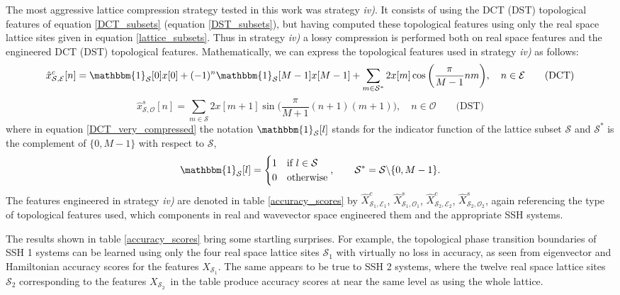 \documentclass[10pt]{revtex4-1}
\newcommand{\indicator}[1]{\mathbbm{1}_{\mathcal{#1}}} %
\newcommand\xSOne{$X_{\mathcal{S}_1}$}
\newcommand\xcSEOne{$\hat{X}^c_{\mathcal{S}_1,\mathcal{E}_1}$}
\newcommand\xsSOOne{$\hat{X}^s_{\mathcal{S}_1,\mathcal{O}_1}$}
\newcommand\xSTwo{$X_{\mathcal{S}_2}$}
\newcommand\xcSETwo{$\hat{X}^c_{\mathcal{S}_2,\mathcal{E}_2}$}
\newcommand\xsSOTwo{$\hat{X}^s_{\mathcal{S}_2,\mathcal{O}_2}$}
\begin{document}
The most aggressive lattice compression strategy tested in this work was strategy \emph{iv)}. It consists of using the DCT (DST) topological features of equation \eqref{DCT_subsets} (equation \eqref{DST_subsets}), but having computed these topological features using only the real space lattice sites given in equation \eqref{lattice_subsets}. Thus in strategy \emph{iv)} a lossy compression is performed both on real space features and the engineered DCT (DST) topological features. Mathematically, we can express the topological features used in strategy \emph{iv)} as follows:
\begin{equation}
\label{DCT_very_compressed}
\hat{x}_{\mathcal{S}, \mathcal{E}}^c[n] = \indicator{\mathcal{S}}[0]x[0] + (-1)^n\indicator{\mathcal{S}}[M-1] x[M-1] + \sum_{m \in \mathcal{S}^*} 2x[m]\cos\bigg(\frac{\pi}{M-1}nm\bigg), \quad n \in \mathcal{E} \qquad \text{(DCT)} 
\end{equation}
\begin{equation}
\label{DST_very_compressed}
\hat{x}_{\mathcal{S}, \mathcal{O}}^s[n] = \sum_{m \in \mathcal{S}}2x[m+1]\sin\bigg(\frac{\pi}{M+1}(n+1)(m+1)\bigg), \quad n \in \mathcal{O} \qquad \text{(DST)}
\end{equation}
where in equation \eqref{DCT_very_compressed} the notation $\mathbbm{1}_{\mathcal{S}}[l]$ stands for the indicator function of the lattice subset $\mathcal{S}$ and $\mathcal{S}^*$ is the complement of $\{0,M-1\}$ with respect to $\mathcal{S}$, 
\begin{equation}
\label{indicator_function}
\indicator{\mathcal{S}}[l] = \begin{cases}
      1 & \text{if } l \in \mathcal{S} \\
      0 & \text{otherwise}
    \end{cases}, \qquad \mathcal{S}^* = \mathcal{S}{\backslash} \{0,M-1\}.
\end{equation}
The features engineered in strategy \emph{iv)} are denoted in table \ref{accuracy_scores} by \xcSEOne, \xsSOOne, \xcSETwo, \xsSOTwo, again referencing the type of topological features used, which components in real and wavevector space engineered them and the appropriate SSH systems. 

The results shown in table \ref{accuracy_scores} bring some startling surprises. For example, the topological phase transition boundaries of SSH 1 systems can be learned using only the four real space lattice sites $\mathcal{S}_1$ with virtually no loss in accuracy, as seen from eigenvector and Hamiltonian accuracy scores for the features \xSOne. The same appears to be true to SSH 2 systems, where the twelve real space lattice sites $\mathcal{S}_2$ corresponding to the features \xSTwo\ in the table produce accuracy scores at near the same level as using the whole lattice.    
\end{document}
